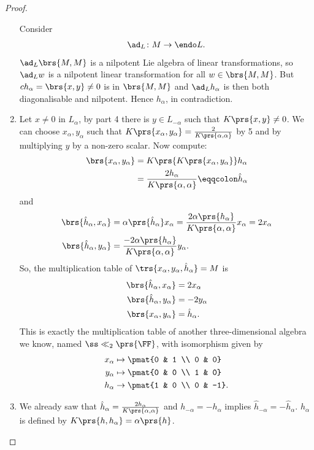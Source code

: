 \documentclass[10pt,a4paper,twoside,openany,hidelinks]{book}
\begin{document}
\begin{proof}
\begin{enumerate}
Consider \[\ad_L \colon M \to \endo L \text{.}\]
$\ad_L\brs{M,M}$ is a nilpotent Lie algebra of linear transformations, so $\ad_L w$ is a nilpotent linear transformation for all $w \in \brs{M,M}$. But $ch_{\alpha} = \brs{x,y} \neq 0$ is in $\brs{M,M}$ and $\ad_L h_{\alpha}$ is then both diagonalisable and nilpotent. Hence $h_{\alpha}$, in contradiction.
\item
Let $x \neq 0$ in $L_{\alpha}$, by part 4 there is $y \in L_{-\alpha}$ such that $K\prs{x,y} \neq 0$.
We can choose $x_{\alpha},y_{\alpha}$ such that $K\prs{x_{\alpha}, y_{\alpha}} = \frac{2}{K\prs{\alpha,\alpha}}$ by 5 and by multiplying $y$ by a non-zero scalar.
Now compute:
\begin{align*}
\brs{x_{\alpha}, y_{\alpha}} &= K\prs{K\prs{x_{\alpha}, y_{\alpha}}} h_{\alpha} \\&=
\frac{2 h_\alpha}{K\prs{\alpha,\alpha}} \eqqcolon \hat{h}_{\alpha}
\end{align*}
and
\begin{align*}
\brs{\hat{h}_{\alpha}, x_{\alpha}} &= \alpha\prs{\hat{h}_{\alpha}} x_{\alpha} = \frac{2 \alpha\prs{h_{\alpha}}}{K\prs{\alpha,\alpha}} x_{\alpha} = 2 x_{\alpha} \\
\brs{\hat{h}_{\alpha}, y_{\alpha}} &= \frac{-2\alpha\prs{h_{\alpha}}}{K\prs{\alpha,\alpha}} y_{\alpha} \text{.}
\end{align*}
So, the multiplication table of $\trs{x_{\alpha}, y_{\alpha}, \hat{h}_{\alpha}} = M$ is
\begin{align*}
\brs{\hat{h}_{\alpha}, x_{\alpha}} &= 2 x_{\alpha} \\
\brs{\hat{h}_{\alpha}, y_{\alpha}} &= -2y_{\alpha} \\
\brs{x_{\alpha}, y_{\alpha}} &= \hat{h}_{\alpha} \text{.}
\end{align*}
This is exactly the multiplication table of another three-dimensional algebra we know, named $\ss\ll_2\prs{\FF}$, with isomorphism given by
\begin{align*}
x_{\alpha} &\mapsto \pmat{0 & 1 \\ 0 & 0} \\
y_{\alpha} &\mapsto \pmat{0 & 0 \\ 1 & 0} \\
h_{\alpha} &\to \pmat{1 & 0 \\ 0 & -1} \text{.} 
\end{align*}
\item We already saw that $\hat{h}_{\alpha} = \frac{2 h_{\alpha}}{K\prs{\alpha, \alpha}}$ and $h_{-\alpha} = -h_{\alpha}$ implies $\hat{h}_{-\alpha} = -\hat{h}_{\alpha}$. $h_{\alpha}$ is defined by $K\prs{h,h_{\alpha}} = \alpha\prs{h}$.
\end{enumerate}
\end{proof}
\end{document}
